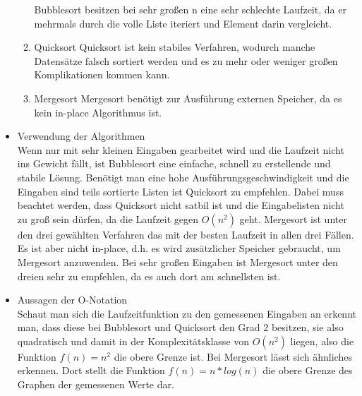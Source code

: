 \begin{itemize}
\begin{enumerate}
					Bubblesort besitzen bei sehr großen n eine sehr schlechte Laufzeit, da er mehrmals durch die volle Liste iteriert und Element darin vergleicht. 			
				\item Quicksort
					Quicksort ist kein stabiles Verfahren, wodurch manche Datensätze falsch sortiert werden und es zu mehr oder weniger großen Komplikationen kommen kann. 
				\item Mergesort
					Mergesort benötigt zur Ausführung externen Speicher, da es kein in-place Algorithmus ist.  
			\end{enumerate}
		\item Verwendung der Algorithmen \\
			Wenn nur mit sehr kleinen Eingaben gearbeitet wird und die Laufzeit nicht ins Gewicht fällt, ist Bubblesort eine einfache, schnell zu erstellende und stabile Lösung.
	Benötigt man eine hohe Ausführungsgeschwindigkeit und die Eingaben sind teils sortierte Listen ist Quicksort zu empfehlen. Dabei muss beachtet werden, dass Quicksort nicht satbil
		ist und die Eingabelisten nicht zu groß sein dürfen, da die Laufzeit gegen $O(n^2)$ geht.
	Mergesort ist unter den drei gewählten Verfahren das mit der besten Laufzeit in allen drei Fällen. Es ist aber nicht in-place, d.h. es wird zusätzlicher Speicher gebraucht, um Mergesort anzuwenden. Bei sehr großen Eingaben ist Mergesort unter den dreien sehr zu empfehlen, da es auch dort am schnellsten ist.
		\item Aussagen der O-Notation\\
	Schaut man sich die Laufzeitfunktion zu den gemessenen Eingaben an erkennt man, dass diese bei Bubblesort und Quicksort den Grad 2 besitzen, sie also quadratisch und damit in der Komplexitätsklasse 
		von $O(n^2)$ liegen, also die Funktion $f(n)=n^2$ die obere Grenze ist.
	Bei Mergesort lässt sich ähnliches erkennen. Dort stellt die Funktion $f(n)=n*log(n)$ die obere Grenze des Graphen der gemessenen Werte dar.

	\end{itemize}

